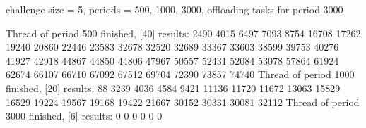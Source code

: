 \documentclass[twoside,twocolumn]{article}
\begin{document}
challenge size = 5, periods = {500, 1000, 3000}, offloading tasks for period 3000

Thread of period 500 finished, [40] results: 2490 4015 6497 7093 8754 16708 17262 19240 20860 22446 23583 32678 32520 32689 33367 33603 38599 39753 40276 41927 42918 44867 44850 44806 47967 50557 52431 52084 53078 57864 61924 62674 66107 66710 67092 67512 69704 72390 73857 74740 
Thread of period 1000 finished, [20] results: 88 3239 4036 4584 9421 11136 11720 11672 13063 15829 16529 19224 19567 19168 19422 21667 30152 30331 30081 32112
Thread of period 3000 finished, [6] results: 0 0 0 0 0 0

\end{document}
